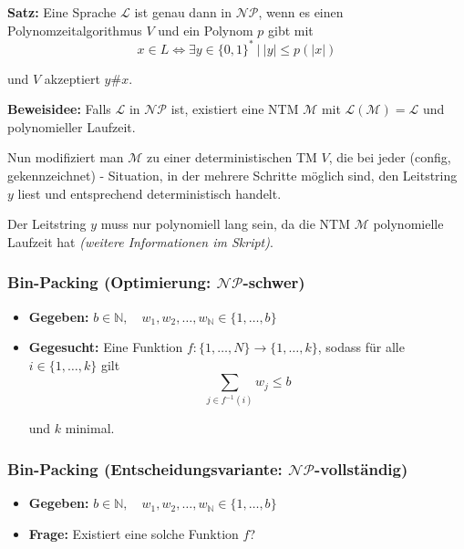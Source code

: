 \documentclass{scrartcl}%
\begin{document}
    \vspace*{0.3cm}
    \textbf{\textsf{Satz:}}
    Eine Sprache $\mathcal{L}$ ist genau dann in $\mathcal{N}\mathcal{P}$, wenn es einen Polynomzeitalgorithmus $V$ und ein Polynom $p$ gibt mit
    \begin{equation*}
        x \in L \Leftrightarrow \exists y \in \{0,1\}^{*} \ |\ |y| \leq p(|x|)
    \end{equation*}

    und $V$ akzeptiert $y\#x$.

    \newpage
    \textbf{\textsf{Beweisidee:}}
    Falls $\mathcal{L}$ in $\mathcal{N}\mathcal{P}$ ist, existiert eine NTM $\mathcal{M}$ mit $\mathcal{L}(\mathcal{M}) = \mathcal{L}$ und polynomieller Laufzeit.

    Nun modifiziert man $\mathcal{M}$ zu einer deterministischen TM $V$, die bei jeder (config, gekennzeichnet) - Situation,
    in der mehrere Schritte möglich sind, den Leitstring $y$ liest und entsprechend deterministisch handelt.

    Der Leitstring $y$ muss nur polynomiell lang sein, da die NTM $\mathcal{M}$ polynomielle Laufzeit hat \textit{(weitere Informationen im Skript)}.

    \subsubsection*{Bin-Packing (Optimierung: $\mathcal{N}\mathcal{P}$-schwer)}
    \begin{itemize}
        \item [] \textbf{\textsf{Gegeben:}} $b \in \mathbb{N},\quad w_1,w_2, \dots, w_\mathbb{N} \in \{1, \dots, b\}$
        \item [] {\textbf{\textsf{Gegesucht:}} Eine Funktion $f : \{1, \dots, N\} \rightarrow \{1, \dots, k\}$,
        sodass für alle $i \in \{1, \dots, k\}$ gilt
        \begin{equation*}
            \sum_{j \in f^{-1}(i) } w_j \leq b
        \end{equation*}

        und $k$ minimal.
        }
    \end{itemize}

    \subsubsection*{Bin-Packing (Entscheidungsvariante: $\mathcal{N}\mathcal{P}$-vollständig)}
    \begin{itemize}
        \item [] \textbf{\textsf{Gegeben:}} $b \in \mathbb{N},\quad w_1,w_2, \dots, w_\mathbb{N} \in \{1, \dots, b\}$
        \item [] {\textbf{\textsf{Frage:}}} Existiert eine solche Funktion $f$?
    \end{itemize}
\end{document}
